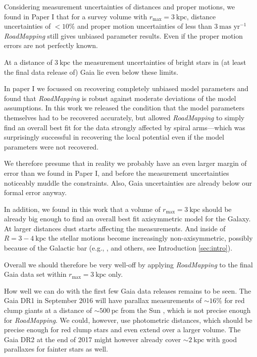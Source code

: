 \documentclass[iop,revtex4,numberedappendix,appendixfloats]{emulateapj}
\newcommand{\RM}{{\sl RoadMapping}}
\begin{document}
Considering measurement uncertainties of distances and proper motions, we found in Paper I that for a survey volume with $r_\text{max} = 3~\text{kpc}$, distance uncertainties of $<10\%$ and proper motion uncertainties of less than $3~\text{mas yr}^{-1}$ \RM{} still gives unbiased parameter results. Even if the proper motion errors are not perfectly known. 

At a distance of $3~\text{kpc}$ the measurement uncertainties of bright stars in (at least the final data release of) Gaia lie even below these limits. 

In paper I we focussed on recovering completely unbiased model parameters and found that \RM{} is robust against moderate deviations of the model assumptions. In this work we released the condition that the model parameters themselves had to be recovered accurately, but allowed \RM{} to simply find an overall best fit for the data strongly affected by spiral arms---which was surprisingly successful in recovering the local potential even if the model parameters were not recovered. 

We therefore presume that in reality we probably have an even larger margin of error than we found in Paper I, and before the measurement uncertainties noticeably muddle the constraints. Also, Gaia uncertainties are already below our formal error anyway.

In addition, we found in this work that a volume of $r_\text{max} = 3~\text{kpc}$ should be already big enough to find an overall best fit axisymmetric model for the Galaxy. At larger distances dust starts affecting the measurements. And inside of $R=3-4~\text{kpc}$ the stellar motions become increasingly non-axisymmetric, possibly because  of the Galactic bar (e.g., \citealt{2014ApJ...783..130R,2015ApJ...800...83B}, and others, see Introduction \ref{sec:intro}).

Overall we should therefore be very well-off by applying \RM{} to the final Gaia data set within $r_\text{max}=3~\text{kpc}$ only.

How well we can do with the first few Gaia data releases remains to be seen. The Gaia DR1 in September 2016 will have parallax measurements of $\sim16\%$ for red clump giants at a distance of $\sim 500~\text{pc}$ from the Sun \citep{2014EAS....67...23D,2015A&A...574A.115M}, which is not precise enough for \RM{}. We could, however, use photometric distances, which should be precise enough for red clump stars and even extend over a larger volume. The Gaia DR2 at the end of 2017 might however already cover $\sim 2~\text{kpc}$ with good parallaxes for fainter stars as well.
\end{document}
